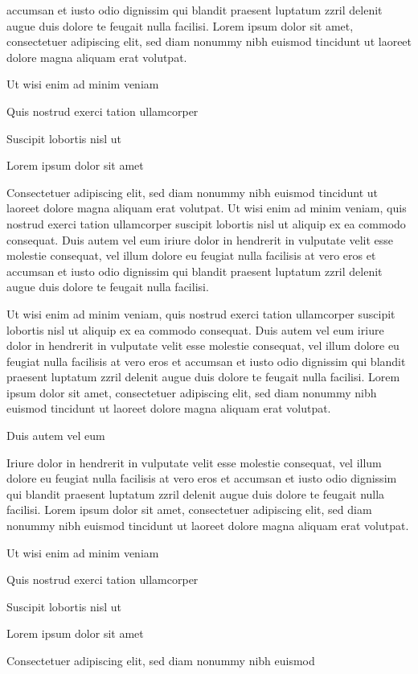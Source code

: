 \documentclass[11pt]{article}\makeatletter
\begin{document}
      accumsan et iusto odio dignissim qui blandit praesent luptatum zzril
      delenit augue duis dolore te feugait nulla facilisi. Lorem ipsum dolor
      sit amet, consectetuer adipiscing elit, sed diam nonummy nibh euismod
      tincidunt ut laoreet dolore magna aliquam erat volutpat. \par Ut wisi enim ad minim veniam\par Quis nostrud exerci tation ullamcorper \par Suscipit lobortis nisl ut \par Lorem ipsum dolor sit amet\par Consectetuer adipiscing elit, sed diam nonummy nibh euismod
      tincidunt ut laoreet dolore magna aliquam erat volutpat. Ut wisi enim
      ad minim veniam, quis nostrud exerci tation ullamcorper suscipit
      lobortis nisl ut aliquip ex ea commodo consequat. Duis autem vel eum
      iriure dolor in hendrerit in vulputate velit esse molestie consequat,
      vel illum dolore eu feugiat nulla facilisis at vero eros et accumsan
      et iusto odio dignissim qui blandit praesent luptatum zzril delenit
      augue duis dolore te feugait nulla facilisi.\par Ut wisi enim ad minim veniam, quis nostrud exerci tation
      ullamcorper suscipit lobortis nisl ut aliquip ex ea commodo
      consequat. Duis autem vel eum iriure dolor in hendrerit in vulputate
      velit esse molestie consequat, vel illum dolore eu feugiat nulla
      facilisis at vero eros et accumsan et iusto odio dignissim qui blandit
      praesent luptatum zzril delenit augue duis dolore te feugait nulla
      facilisi. Lorem ipsum dolor sit amet, consectetuer adipiscing elit,
      sed diam nonummy nibh euismod tincidunt ut laoreet dolore magna
      aliquam erat volutpat. \par Duis autem vel eum \par Iriure dolor in hendrerit in vulputate velit esse molestie
      consequat, vel illum dolore eu feugiat nulla facilisis at vero eros et
      accumsan et iusto odio dignissim qui blandit praesent luptatum zzril
      delenit augue duis dolore te feugait nulla facilisi. Lorem ipsum dolor
      sit amet, consectetuer adipiscing elit, sed diam nonummy nibh euismod
      tincidunt ut laoreet dolore magna aliquam erat volutpat. \par Ut wisi enim ad minim veniam\par Quis nostrud exerci tation ullamcorper \par Suscipit lobortis nisl ut \par Lorem ipsum dolor sit amet\par Consectetuer adipiscing elit, sed diam nonummy nibh euismod
\end{document}
